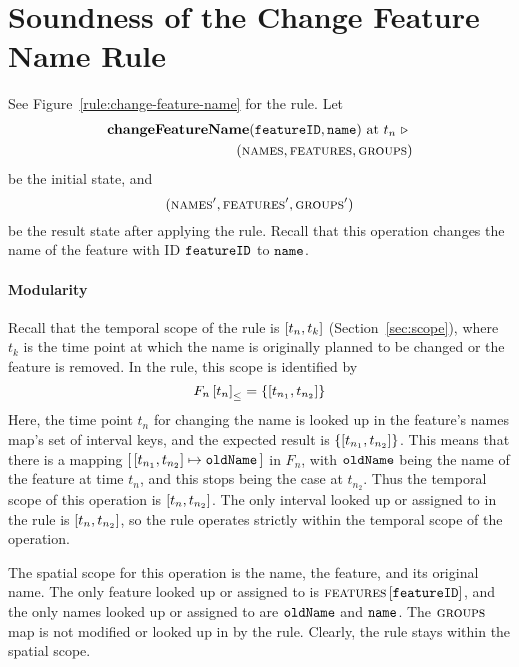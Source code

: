 \section{Soundness of the Change Feature Name Rule} 
\label{sec:soundness-of-the-change-feature-name-rule}

See Figure~\vref{rule:change-feature-name} for the  rule. Let 
\begin{equation*}
   \begin{split}
      \textbf{changeFeatureName}(\texttt{featureID}, \texttt{name}) \text{ at } t_n \ \triangleright \  \\
      (\textsc{names}, \textsc{features}, \textsc{groups}{})
   \end{split}
\end{equation*}
be the initial state, and
\[
   (\textsc{names}', \textsc{features}', \textsc{groups}{}')
\]
be the result state after applying the  rule. Recall that this operation changes the name of the feature with ID $\texttt{featureID}$ to $\texttt{name}$.

\paragraph{Modularity}
Recall that the temporal scope of the  rule is $\interval{t_n}{t_k}$ (Section~\vref{sec:scope}), where $t_k$ is the time point at which the name is originally planned to be changed or the feature is removed. In the rule, this scope is identified by 
   \[
      \containing{F_n}{t_n} = \set{\interval{t_{n_1}}{t_{n_2}}}
   \]
   Here, the time point $t_n$ for changing the name is looked up in the feature's names map's set of interval keys, and the expected result is $\set{\interval{t_{n_1}}{t_{n_2}}}$. This means that there is a mapping $\intervalmapping{t_{n_1}}{t_{n_2}}{\var{oldName}}$ in $F_n$, with $\texttt{oldName}$ being the name of the feature at time $t_n$, and this stops being the case at $t_{n_2}$. Thus the temporal scope of this operation is $\interval{t_n}{t_{n_2}}$. The only interval looked up or assigned to in the rule is $\interval{t_n}{t_{n_2}}$, so the rule operates strictly within the temporal scope of the operation.

   The spatial scope for this operation is the name, the feature, and its original name. The only feature looked up or assigned to is $\textsc{features} \left[ \texttt{featureID} \right]$, and the only names looked up or assigned to are $\texttt{oldName}$ and $\texttt{name}$. The $\textsc{groups}{}{}$ map is not modified or looked up in by the rule. Clearly, the rule stays within the spatial scope.

